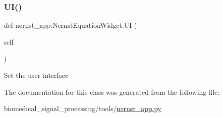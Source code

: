 \subsubsection{\texorpdfstring{U\+I()}{UI()}}
{\footnotesize\ttfamily def nernst\+\_\+app.\+Nernst\+Equation\+Widget.\+UI (\begin{DoxyParamCaption}\item[{}]{self }\end{DoxyParamCaption})}

\begin{DoxyVerb}Set the user interface
\end{DoxyVerb}
 

The documentation for this class was generated from the following file\+:\begin{DoxyCompactItemize}
\item 
biomedical\+\_\+signal\+\_\+processing/tools/\hyperlink{nernst__app_8py}{nernst\+\_\+app.\+py}\end{DoxyCompactItemize}
